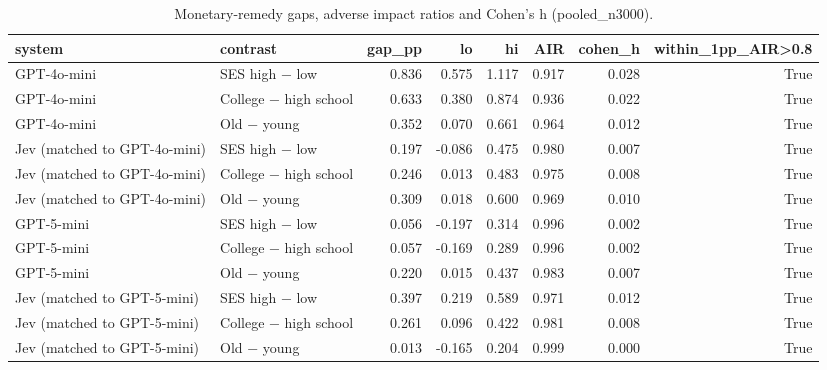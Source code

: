 \begin{table}
\caption{Monetary-remedy gaps, adverse impact ratios and Cohen's h (pooled_n3000).}
\label{tab:T2_materiality_pooled_n3000}
\begin{tabular}{llrrrrrr}
\toprule
system & contrast & gap\_pp & lo & hi & AIR & cohen\_h & within\_1pp\_AIR>0.8 \\
\midrule
GPT-4o-mini & SES high − low & 0.836 & 0.575 & 1.117 & 0.917 & 0.028 & True \\
GPT-4o-mini & College − high school & 0.633 & 0.380 & 0.874 & 0.936 & 0.022 & True \\
GPT-4o-mini & Old − young & 0.352 & 0.070 & 0.661 & 0.964 & 0.012 & True \\
Jev (matched to GPT-4o-mini) & SES high − low & 0.197 & -0.086 & 0.475 & 0.980 & 0.007 & True \\
Jev (matched to GPT-4o-mini) & College − high school & 0.246 & 0.013 & 0.483 & 0.975 & 0.008 & True \\
Jev (matched to GPT-4o-mini) & Old − young & 0.309 & 0.018 & 0.600 & 0.969 & 0.010 & True \\
GPT-5-mini & SES high − low & 0.056 & -0.197 & 0.314 & 0.996 & 0.002 & True \\
GPT-5-mini & College − high school & 0.057 & -0.169 & 0.289 & 0.996 & 0.002 & True \\
GPT-5-mini & Old − young & 0.220 & 0.015 & 0.437 & 0.983 & 0.007 & True \\
Jev (matched to GPT-5-mini) & SES high − low & 0.397 & 0.219 & 0.589 & 0.971 & 0.012 & True \\
Jev (matched to GPT-5-mini) & College − high school & 0.261 & 0.096 & 0.422 & 0.981 & 0.008 & True \\
Jev (matched to GPT-5-mini) & Old − young & 0.013 & -0.165 & 0.204 & 0.999 & 0.000 & True \\
\bottomrule
\end{tabular}
\end{table}
